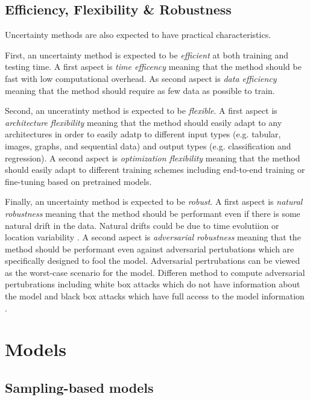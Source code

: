 \subsection{Efficiency, Flexibility \& Robustness}

Uncertainty methods are also expected to have practical characteristics. 

First, an uncertainty method is expected to be \emph{efficient} at both training and testing time. 
A first aspect is \emph{time efficency} meaning that the method should be fast with low computational overhead.
As second aspect is \emph{data efficiency} meaning that the method should require as few data as possible to train.

Second, an unceratinty method is expected to be \emph{flexible}.
A first aspect is \emph{architecture flexibility} meaning that the method should easily adapt to any architectures in order to easily adatp to different input types (e.g. tabular, images, graphs, and sequential data) and output types (e.g. classification and regression).
A second aspect is \emph{optimization flexibility} meaning that the method should easily adapt to different training schemes including end-to-end training or fine-tuning based on pretrained models.

Finally, an uncertainty method is expected to be \emph{robust}.
A first aspect is \emph{natural robustness} meaning that the method should be performant even if there is some natural drift in the data. Natural drifts could be due to time evolutiion or location variability .
A second aspect is \emph{adversarial robustness} meaning that the method should be performant even against adversarial pertubations which are specifically designed to fool the model. Adversarial pertrubations can be viewed as the worst-case scenario for the model. Differen method to compute adversarial pertubrations including white box attacks which do not have information about the model  and black box attacks which have full access to the model information .

\section{Models}

\subsection{Sampling-based models}

